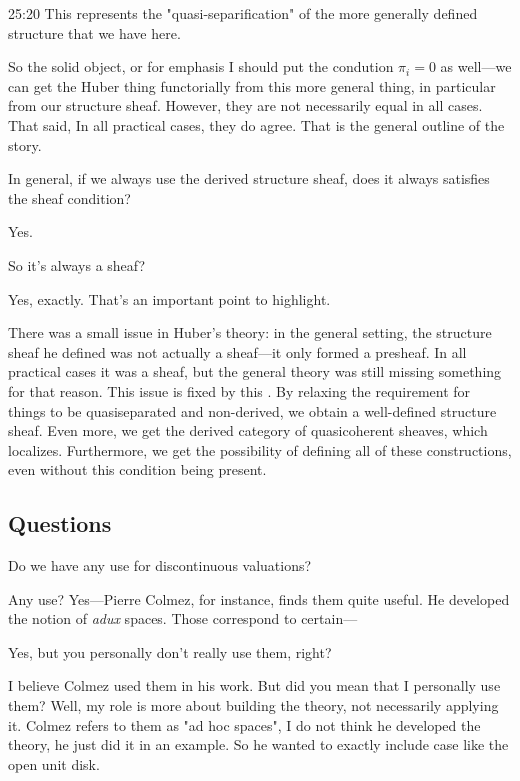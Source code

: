 \begin{unfinished}{25:20}
This represents the "quasi-separification" of the more generally defined structure that we have here. 


So the solid object, or for emphasis I should put the condution $\pi_i = 0$ as well---we can get the Huber thing functorially from this more general thing, in particular from our structure sheaf. 
However, they are not necessarily equal in all cases. That said, In all practical cases, they do agree. That is the general outline of the story.

\ques In general, if we always use the derived structure sheaf, does it always satisfies the sheaf condition?

\ans Yes.

\ques So it's always a sheaf?


\ans Yes, exactly. That's an important point to highlight. 


There was a small issue in Huber's theory: in the general setting, the structure sheaf he defined was not actually a sheaf---it only formed a presheaf.
In all practical cases it was a sheaf, but the general theory was still missing something for that reason. This issue is fixed by this . By relaxing the requirement for things to be quasiseparated and non-derived, we obtain a well-defined  structure sheaf. Even more, we get the derived category of quasicoherent sheaves, which localizes. Furthermore, we get the possibility of defining all of these constructions, even without this condition being present.

\subsection{Questions}

\ques Do we have any use for discontinuous valuations? 

\ans Any use? Yes---Pierre Colmez, for instance, finds them quite useful. He developed the notion of \emph{adux} spaces. Those correspond to certain---


\ques Yes, but you personally don't really use them, right?

\ans I believe Colmez used them in his work. But did you mean that I personally use them? Well, my role is more about building the theory, not necessarily applying it. Colmez refers to them as "ad hoc spaces", I do not think he developed the theory, he just did it in an example. So he wanted to exactly include case like the open unit disk.


\end{unfinished}
